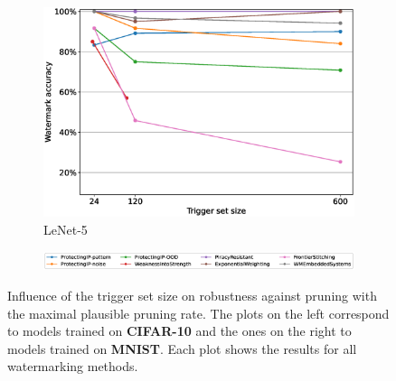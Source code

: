 \begin{figure}
\begin{subfigure}{0.4\linewidth}
        \includegraphics[width=\linewidth]{images/pruning/lenet5_pruning_per_arch_maximal_pr_rate.eps}
        \caption{LeNet-5}
        \label{fig:pruning-max-pr-rate-lenet5}
    \end{subfigure}
    
    \begin{subfigure}{\linewidth}
    \centering
    \includegraphics[width=0.7\linewidth]{images/pruning/legend_pruning_per_arch_maximal_pr_rate.eps}
    \end{subfigure}
    
    \caption{Influence of the trigger set size on robustness against pruning with the maximal plausible pruning rate. The plots on the left correspond to models trained on \textbf{CIFAR-10} and the ones on the right to models trained on \textbf{MNIST}. Each plot shows the results for all watermarking methods.}
    \label{fig:pruning-max-pr-rate-perarch}
\end{figure}
